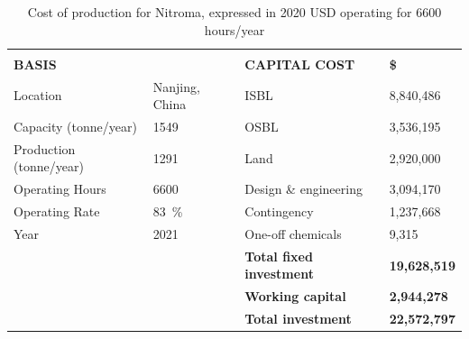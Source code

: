 \begin{table}[H]
\centering
\caption{Cost of production for Nitroma, expressed in 2020 USD operating for 6600 hours/year}
\label{Cost_of_production}
\begin{tabular}{@{}llllll@{}}
                              &                       &                                       &                           &                            &                      \\
\multicolumn{2}{l}{\textbf{BASIS}}                    & \textbf{}                             & \multicolumn{2}{l}{\textbf{CAPITAL COST}}              & \textbf{\$}          \\ \cline{1-2} \cline{4-6} 
Location                      & \multicolumn{2}{l}{Nanjing, China}                            & \multicolumn{2}{l}{ISBL}                               & 8,840,486            \\
Capacity (tonne/year)         & 1549                  &                                       & \multicolumn{2}{l}{OSBL}                               & 3,536,195            \\
Production (tonne/year)       & 1291                  &                                       & \multicolumn{2}{l}{Land}                               & 2,920,000            \\
Operating Hours               & 6600                  &                                       & \multicolumn{2}{l}{Design \& engineering}              & 3,094,170            \\
Operating Rate                & \SI{83}{\percent}                  &                                       & \multicolumn{2}{l}{Contingency}                        & 1,237,668            \\
Year                          & 2021                  &                                       & \multicolumn{2}{l}{One-off chemicals}                  & 9,315                \\ \cline{6-6} 
                              &                       &                                       & \multicolumn{2}{l}{\textbf{Total fixed investment}}    & \textbf{19,628,519}  \\
                              &                       &                                       & \multicolumn{2}{l}{\textbf{Working capital}}           & \textbf{2,944,278}   \\ \cline{6-6} 
                              &                       &                                       & \multicolumn{2}{l}{\textbf{Total investment}}          & \textbf{22,572,797}  \\

\end{tabular}
\end{table}
